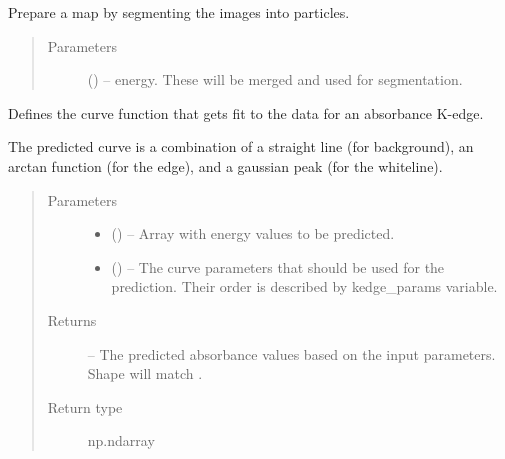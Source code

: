 \documentclass[letterpaper,10pt,english]{sphinxmanual}
\begin{document}

\begin{fulllineitems}
\label{\detokenize{xanespy:xanespy.xanes_math.particle_labels}}
Prepare a map by segmenting the images into particles.
\begin{quote}\begin{description}
\item[{Parameters}] \leavevmode
{} (\sphinxstyleliteralemphasis{-}) -- energy. These will be merged and used for segmentation.

\end{description}\end{quote}

\end{fulllineitems}


\begin{fulllineitems}
\label{\detokenize{xanespy:xanespy.xanes_math.predict_edge}}
Defines the curve function that gets fit to the data for an
absorbance K-edge.

The predicted curve is a combination of a straight line (for
background), an arctan function (for the edge), and a gaussian
peak (for the whiteline).
\begin{quote}\begin{description}
\item[{Parameters}] \leavevmode\begin{itemize}
\item {} 
 () -- Array with energy values to be predicted.

\item {} 
 (\sphinxstyleliteralemphasis{(}\sphinxstyleliteralemphasis{)}\sphinxstyleliteralemphasis{}) -- The curve parameters that should be used for the
prediction. Their order is described by kedge\_params variable.

\end{itemize}

\item[{Returns}] \leavevmode
{} -- The predicted absorbance values based on the input
parameters. Shape will match .

\item[{Return type}] \leavevmode
np.ndarray

\end{description}\end{quote}

\end{fulllineitems}
\end{document}
